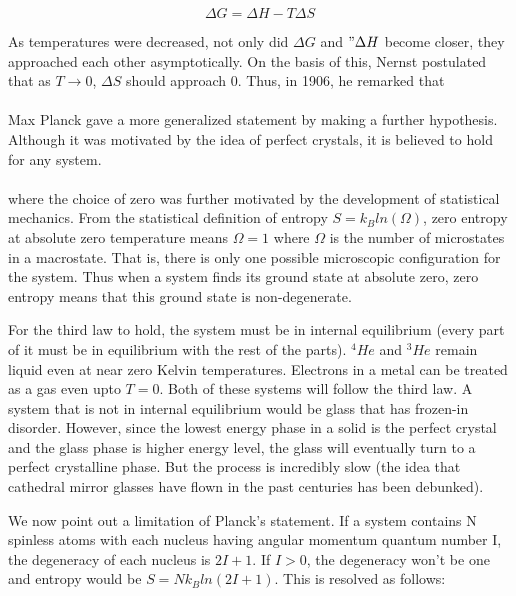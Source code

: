 \documentclass{article}
\begin{document}
	$$ \Delta G = \Delta H - T\Delta S $$
	
	As temperatures were decreased, not only did $\Delta G$ and $"\Delta H$ become closer, they approached each other asymptotically. On the basis of this, Nernst postulated that as $T \rightarrow 0$, $\Delta S$ should approach $0$. Thus, in 1906, he remarked that\\
	
	\noindent{}\\

	Max Planck gave a more generalized statement by making a further hypothesis. Although it was motivated by the idea of perfect crystals, it is believed to hold for any system.\\
	
	\noindent{}\\
	
	where the choice of zero was further motivated by the development of statistical mechanics. From the statistical definition of entropy $S = k_B ln(\Omega)$, zero entropy at absolute zero temperature means $\Omega = 1$ where $\Omega$ is the number of microstates in a macrostate. That is, there is only one possible microscopic configuration for the system. Thus when a system finds its ground state at absolute zero, zero entropy means that this ground state is non-degenerate.
	
	For the third law to hold, the system must be in internal equilibrium (every part of it must be in equilibrium with the rest of the parts). $^4He$ and $^3He$ remain liquid even at near zero Kelvin temperatures. Electrons in a metal can be treated as a gas even upto $T=0$. Both of these systems will follow the third law. A system that is not in internal equilibrium would be glass that has frozen-in disorder. However, since the lowest energy phase in a solid is the perfect crystal and the glass phase is higher energy level, the glass will eventually turn to a perfect crystalline phase. But the process is incredibly slow (the idea that cathedral mirror glasses have flown in the past centuries has been debunked).
	
	We now point out a limitation of Planck's statement. If a system contains N spinless atoms with each nucleus having angular momentum quantum number I, the degeneracy of each nucleus is $2I+1$. If $I>0$, the degeneracy won't be one and entropy would be $S = Nk_Bln(2I+1)$. This is resolved as follows:\\
	
\end{document}
